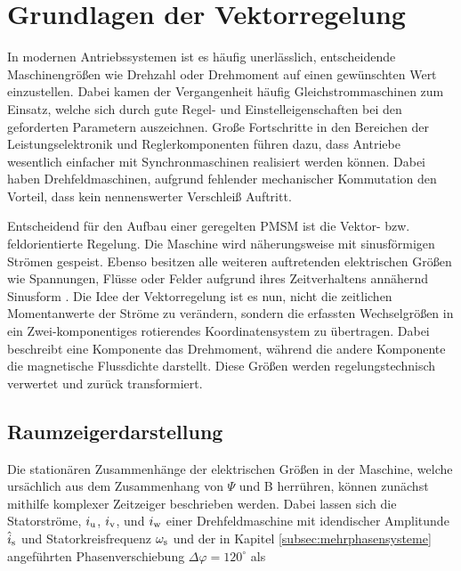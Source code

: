 

\chapter{Grundlagen der Vektorregelung}
\label{cha:Grundlagen der Vektorregelung}

In modernen Antriebssystemen ist es häufig unerlässlich, entscheidende Maschinengrößen wie Drehzahl oder Drehmoment auf einen gewünschten Wert einzustellen.
Dabei kamen der Vergangenheit häufig Gleichstrommaschinen zum Einsatz, welche sich durch gute Regel- und Einstelleigenschaften bei den geforderten Parametern auszeichnen.
Große Fortschritte in den Bereichen der Leistungselektronik und Reglerkomponenten führen dazu, dass Antriebe wesentlich einfacher mit Synchronmaschinen realisiert werden können.
Dabei haben Drehfeldmaschinen, aufgrund fehlender mechanischer Kommutation den Vorteil, dass kein nennenswerter Verschleiß Auftritt.

Entscheidend für den Aufbau einer geregelten PMSM ist die Vektor- bzw. feldorientierte Regelung. 
Die Maschine wird näherungsweise mit sinusförmigen Strömen gespeist. 
Ebenso besitzen alle weiteren auftretenden elektrischen Größen wie Spannungen, Flüsse oder Felder aufgrund ihres Zeitverhaltens annähernd Sinusform \parencite[S.~1]{nuss2010}.	
Die Idee der Vektorregelung ist es nun, nicht die zeitlichen Momentanwerte der Ströme zu verändern, sondern die erfassten Wechselgrößen in ein Zwei-komponentiges rotierendes Koordinatensystem zu übertragen.
Dabei beschreibt eine Komponente das Drehmoment, während die andere Komponente die magnetische Flussdichte darstellt.
Diese Größen werden regelungstechnisch verwertet und zurück transformiert.

\section{Raumzeigerdarstellung}
\label{sec:raumzeiger}

Die stationären Zusammenhänge der elektrischen Größen in der Maschine, welche ursächlich aus dem Zusammenhang von $\Psi$ und B herrühren, können zunächst mithilfe komplexer Zeitzeiger beschrieben werden. Dabei lassen sich die Statorströme, $i_{\mathrm{u}}$, $i_{\mathrm{v}}$, und $i_{\mathrm{w}}$ einer Drehfeldmaschine mit idendischer Amplitunde $\hat i_{\mathrm{s}}$ und Statorkreisfrequenz $\omega_{\mathrm{s}}$  und der in Kapitel \ref{subsec:mehrphasensysteme} angeführten Phasenverschiebung $\Delta \varphi = 120^{\circ}$ als


